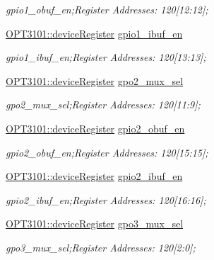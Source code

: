 \begin{DoxyCompactItemize}
\begin{DoxyCompactList}\small\item\em gpio1\+\_\+obuf\+\_\+en;Register Addresses\+: 120\mbox{[}12\+:12\mbox{]}; \end{DoxyCompactList}\item 
\mbox{\hyperlink{class_o_p_t3101_1_1device_register}{O\+P\+T3101\+::device\+Register}} \mbox{\hyperlink{class_o_p_t3101_1_1registers_a4941abf69a5c7d40800bb34b9ee2471f}{gpio1\+\_\+ibuf\+\_\+en}}
\begin{DoxyCompactList}\small\item\em gpio1\+\_\+ibuf\+\_\+en;Register Addresses\+: 120\mbox{[}13\+:13\mbox{]}; \end{DoxyCompactList}\item 
\mbox{\hyperlink{class_o_p_t3101_1_1device_register}{O\+P\+T3101\+::device\+Register}} \mbox{\hyperlink{class_o_p_t3101_1_1registers_a8ec82d04684d9ac714f5f65581b2b26e}{gpo2\+\_\+mux\+\_\+sel}}
\begin{DoxyCompactList}\small\item\em gpo2\+\_\+mux\+\_\+sel;Register Addresses\+: 120\mbox{[}11\+:9\mbox{]}; \end{DoxyCompactList}\item 
\mbox{\hyperlink{class_o_p_t3101_1_1device_register}{O\+P\+T3101\+::device\+Register}} \mbox{\hyperlink{class_o_p_t3101_1_1registers_a368d0649a8a17b1088e860ce0916f854}{gpio2\+\_\+obuf\+\_\+en}}
\begin{DoxyCompactList}\small\item\em gpio2\+\_\+obuf\+\_\+en;Register Addresses\+: 120\mbox{[}15\+:15\mbox{]}; \end{DoxyCompactList}\item 
\mbox{\hyperlink{class_o_p_t3101_1_1device_register}{O\+P\+T3101\+::device\+Register}} \mbox{\hyperlink{class_o_p_t3101_1_1registers_a1416f61431e4cc51c6ea6118747d0fe3}{gpio2\+\_\+ibuf\+\_\+en}}
\begin{DoxyCompactList}\small\item\em gpio2\+\_\+ibuf\+\_\+en;Register Addresses\+: 120\mbox{[}16\+:16\mbox{]}; \end{DoxyCompactList}\item 
\mbox{\hyperlink{class_o_p_t3101_1_1device_register}{O\+P\+T3101\+::device\+Register}} \mbox{\hyperlink{class_o_p_t3101_1_1registers_ab22a909059e064027f01864e2db58eb4}{gpo3\+\_\+mux\+\_\+sel}}
\begin{DoxyCompactList}\small\item\em gpo3\+\_\+mux\+\_\+sel;Register Addresses\+: 120\mbox{[}2\+:0\mbox{]}; \end{DoxyCompactList}\item 

\end{DoxyCompactItemize}
